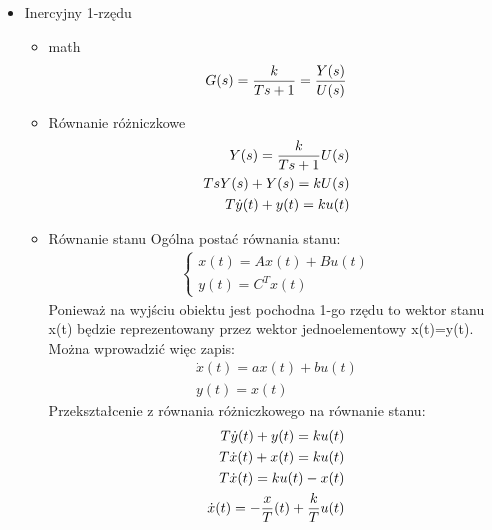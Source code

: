 \documentclass[a4paper,10pt]{article}
\begin{document}
\begin{itemize}
\item Inercyjny 1-rzędu

\begin{itemize}
\item math	
	\begin{eqnarray}
		G(s)= {k \over {Ts + 1}} = {Y(s) \over U(s)}
	\end{eqnarray}
\item Równanie różniczkowe
	\begin{eqnarray}
		Y(s) = {k \over {Ts + 1}} U(s)\\
		\nonumber TsY(s) + Y(s) = kU(s)\\
		\nonumber T\dot{y}(t) + y(t) = ku(t)
	\end{eqnarray}
\item Równanie stanu
\newline Ogólna postać równania stanu: %
	\begin{eqnarray}
		\left\{
			\begin{array}{l}
				x(t) = Ax(t) + Bu(t)\\
				y(t) = C^{T}x(t)
			\end{array} \right.
	\end{eqnarray}
Ponieważ na wyjściu obiektu jest pochodna 1-go rzędu to wektor stanu x(t) będzie reprezentowany przez wektor jednoelementowy x(t)=y(t). Można wprowadzić więc zapis:
	\begin{eqnarray}
		\dot{x}(t) = ax(t) + bu(t)\\
		\nonumber y(t) = x(t)
	\end{eqnarray}
Przekształcenie z równania różniczkowego na równanie stanu: %
	\begin{eqnarray}
		T\dot{y}(t) + y(t) = ku(t)\\
		\nonumber T\dot{x}(t) + x(t) = ku(t)\\
		\nonumber T\dot{x}(t) = ku(t) - x(t)\\
		\nonumber \dot{x}(t) = -{x \over T}(t) + {k \over T}u(t)
	\end{eqnarray}
\end{itemize}


\end{itemize}
\end{document}
